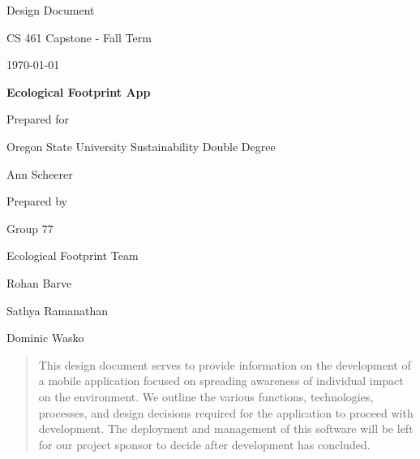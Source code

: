 \documentclass[onecolumn, draftclsnofoot,10pt, compsoc, tikz]{IEEEtran}
\def \CapstoneTeamName{		Ecological Footprint Team}
\def \CapstoneTeamNumber{		77}
\def \GroupMemberOne{			Rohan Barve}
\def \GroupMemberTwo{			Sathya Ramanathan}
\def \GroupMemberThree{			Dominic Wasko}
\def \CapstoneProjectName{		Ecological Footprint App}
\def \CapstoneSponsorCompany{	Oregon State University Sustainability Double Degree}
\def \CapstoneSponsorPerson{		Ann Scheerer}
\def \DocType{Design Document}
\newcommand{\NameSigPair}[1]{\par
\makebox[2.75in][r]{#1} \hfil 	\makebox[3.25in]{\makebox[2.25in]{\hrulefill} \hfill		\makebox[.75in]{\hrulefill}}
\par\vspace{-12pt} \textit{\tiny\noindent
\makebox[2.75in]{} \hfil		\makebox[3.25in]{\makebox[2.25in][r]{Signature} \hfill	\makebox[.75in][r]{Date}}}}
\renewcommand{\NameSigPair}[1]{#1}
\begin{document}
\begin{titlepage}
    \begin{singlespace}
        \hfill 
        \par\vspace{.2in}
        \centering
        \scshape{
	 \huge \DocType \par
            \huge CS 461 Capstone - Fall Term \par
            {\large\today}\par
            \vspace{.5in}
            \textbf{\Huge\CapstoneProjectName}\par
            \vfill
            {\large Prepared for}\par
            \Huge \CapstoneSponsorCompany\par
            \vspace{5pt}
            {\Large\NameSigPair{\CapstoneSponsorPerson}\par}
            {\large Prepared by }\par
            Group\CapstoneTeamNumber\par
            \CapstoneTeamName\par 
            \vspace{5pt}
            {\Large
                \NameSigPair{\GroupMemberOne}\par
                \NameSigPair{\GroupMemberTwo}\par
                \NameSigPair{\GroupMemberThree}\par
            }
            \vspace{20pt}
        }
        
        \begin{abstract}
        This design document serves to provide information on the development of a mobile application focused on spreading awareness of individual impact on the environment. We outline the various functions, technologies, processes, and design decisions required for the application to proceed with development. The deployment and management of this software will be left for our project sponsor to decide after development has concluded. 
        	
        \end{abstract}  
        
        
    \end{singlespace}
\end{titlepage}
\newpage
{}
\tableofcontents
\listoffigures
\listoftables
\clearpage
\end{document}
